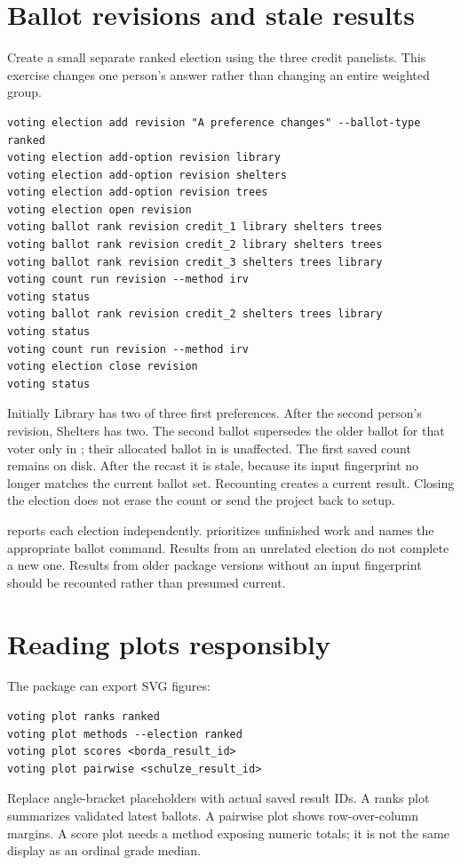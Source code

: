 \section{Ballot revisions and stale results}
Create a small separate ranked election using the three credit panelists. This exercise changes one person's answer rather than changing an entire weighted group.
\begin{lstlisting}[style=votingrun]
voting election add revision "A preference changes" --ballot-type ranked
voting election add-option revision library
voting election add-option revision shelters
voting election add-option revision trees
voting election open revision
voting ballot rank revision credit_1 library shelters trees
voting ballot rank revision credit_2 library shelters trees
voting ballot rank revision credit_3 shelters trees library
voting count run revision --method irv
voting status
voting ballot rank revision credit_2 shelters trees library
voting status
voting count run revision --method irv
voting election close revision
voting status
\end{lstlisting}
Initially Library has two of three first preferences. After the second person's revision, Shelters has two. The second ballot supersedes the older ballot for that voter only in ; their allocated ballot in  is unaffected.
The first saved count remains on disk. After the recast it is stale, because its input fingerprint no longer matches the current ballot set. Recounting creates a current result. Closing the election does not erase the count or send the project back to setup.

 reports each election independently.  prioritizes unfinished work and names the appropriate ballot command. Results from an unrelated election do not complete a new one. Results from older package versions without an input fingerprint should be recounted rather than presumed current.

\section{Reading plots responsibly}
The package can export SVG figures:
\begin{lstlisting}
voting plot ranks ranked
voting plot methods --election ranked
voting plot scores <borda_result_id>
voting plot pairwise <schulze_result_id>
\end{lstlisting}
Replace angle-bracket placeholders with actual saved result IDs. A ranks plot summarizes validated latest ballots. A pairwise plot shows row-over-column margins. A score plot needs a method exposing numeric totals; it is not the same display as an ordinal grade median.

